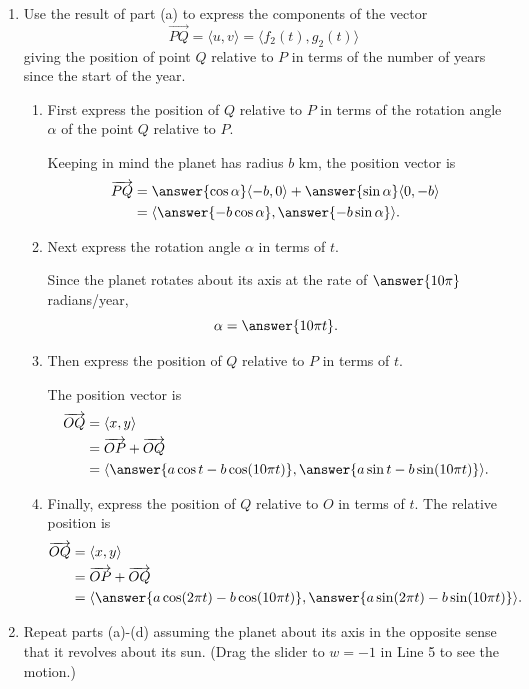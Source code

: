 \documentclass{ximera}
\begin{document}
\begin{question}
\begin{enumerate}
\item  Use the result of part (a) to express the components of the vector
 \[
  \overrightarrow{PQ} =  \langle u, v \rangle =   \langle f_2(t) , g_2(t) \rangle
\]
giving the position of point $Q$ relative to $P$ in terms of the number of years since the start of the year.

\begin{enumerate}
\item First express the position of $Q$ relative to $P$ in terms of the rotation angle $\alpha$ of the point $Q$ relative to $P$.

Keeping in mind the planet has radius $b$ km, the position vector is 
\begin{align*}
       \overrightarrow{PQ} &= \answer{\cos\alpha} \langle -b, 0 \rangle + \answer{\sin \alpha} \langle 0,-b  \rangle \\ 
                                     &=  \langle \answer{-b\cos \alpha}, \answer{-b\sin\alpha} \rangle . 
\end{align*}

\item Next express the rotation angle $\alpha$ in terms of $t$.

Since the planet rotates about its axis at the rate of $\answer{10\pi}$ radians/year,
\[
 \alpha = \answer{10\pi t}.
\]

\item Then  express the position of $Q$ relative to $P$ in terms of $t$.

The position vector is
\begin{align*}
       \overrightarrow{OQ} &= \langle x , y \rangle \\
                                      &= \overrightarrow{OP} + \overrightarrow{OQ} \\
                                     &=  \langle \answer{a\cos t -b \cos (10\pi t)}, \answer{a \sin t - b\sin(10\pi t)} \rangle . 
\end{align*}

\item Finally, express the position of $Q$ relative to $O$ in terms of $t$.
The relative position is
\begin{align*}
       \overrightarrow{OQ} &= \langle x , y \rangle \\
                                      &= \overrightarrow{OP} + \overrightarrow{OQ} \\
                                     &=  \langle \answer{a\cos(2\pi t) -b\cos (10\pi t)}, \answer{a\sin (2\pi t) - b\sin(10\pi t)} \rangle . 
\end{align*}


\end{enumerate}

\item Repeat parts (a)-(d) assuming the planet about its axis in the opposite sense that it revolves about its sun. (Drag the slider to $w=-1$ in Line 5 to see the motion.)


\end{enumerate}
\end{question}
\end{document}
